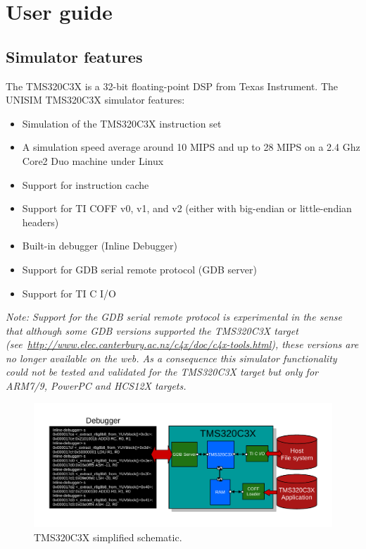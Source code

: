 \section{User guide}

\subsection{Simulator features}

The TMS320C3X is a 32-bit floating-point DSP from Texas Instrument.
The UNISIM TMS320C3X simulator features:
\begin{itemize}
\item Simulation of the TMS320C3X instruction set
\item A simulation speed average around 10 MIPS and up to 28 MIPS on a 2.4 Ghz Core2 Duo machine under Linux
\item Support for instruction cache
\item Support for TI COFF v0, v1, and v2 (either with big-endian or little-endian headers)
\item Built-in debugger (Inline Debugger)
\item Support for GDB serial remote protocol (GDB server)
\item Support for TI C I/O
\end{itemize}

\textit{Note: Support for the GDB serial remote protocol is experimental in the sense that although some GDB versions supported the TMS320C3X target (see~\url{http://www.elec.canterbury.ac.nz/c4x/doc/c4x-tools.html}), these versions are no longer available on the web. As a consequence this simulator functionality could not be tested and validated for the TMS320C3X target but only for ARM7/9, PowerPC and HCS12X targets.}

\begin{figure}[!h]
	\begin{center}
		\includegraphics[width=\textwidth]{tms320c3x/fig_tms320c3x.pdf}
	\end{center}
	\caption{TMS320C3X simplified schematic.}
	\label{fig:tms320c3x}
\end{figure}

